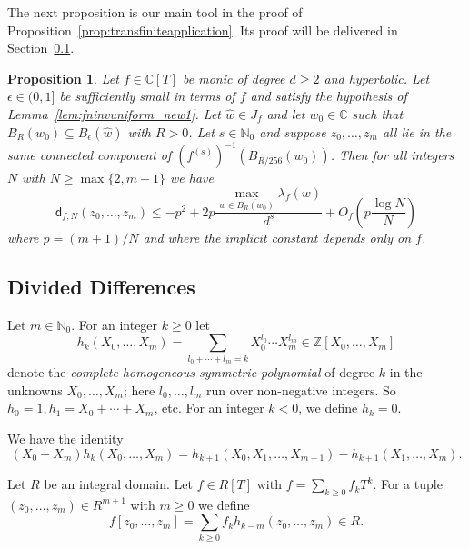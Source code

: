 \documentclass[12pt,oneside,a4]{amsart}
\newcommand{\IC}{\mathbb{C}}
\newcommand{\IN}{\mathbb{N}}
\newcommand{\IZ}{\mathbb{Z}}
\newcounter{maincounter}
\numberwithin{maincounter}{section}
\numberwithin{equation}{section}
\newtheorem{proposition}[maincounter]{Proposition}
\renewcommand{\subset}{\subseteq}
\begin{document}
The next proposition is our main tool in the proof of
Proposition~\ref{prop:transfiniteapplication}. Its proof will be
delivered in Section~\ref{subsec:genvander}.

\begin{proposition}
  \label{prop:vandermondepreboundhyperbolic}
  Let $f\in\IC[T]$ be monic of degree $d\ge 2$ and hyperbolic.
  Let $\epsilon\in (0,1]$ be sufficiently small in terms of $f$ and
  satisfy the hypothesis of  Lemma~\ref{lem:fninvuniform_new1}. 
  Let $\widehat w\in J_{f}$ and let $w_0\in\IC$
  such that $\overline{B_{R}(w_0)}\subset B_\epsilon(\widehat w)$ with
  $R>0$.
  Let $s\in\IN_0$ and suppose $z_0,\ldots,z_m$ all lie in the same
  connected component of 
  $(f^{(s)})^{-1}(B_{R/256}(w_0))$.
  Then for all integers $N$ with $N\ge \max\{2,m+1\}$ we have
  \begin{equation}
    \label{eq:thmvandermondepreboundhyperbolicbd}
    \mathsf{d}_{f,N}(z_0,\ldots,z_m)\le
    -p^2+
    2p \frac{\max_{w\in \overline{B_R(w_0)}} \lambda_f(w)}{d^s}  + O_f\left(p\frac{\log N}{N}\right)   
  \end{equation}
  where $p=(m+1)/N$ and where the implicit constant depends only on $f$.
\end{proposition}

\subsection{Divided Differences}
\label{subsec:genvander}


Let $m\in\IN_0$. For an integer $k\ge 0$ let
\begin{equation*}
  h_k(X_0,\ldots,X_m) = \sum_{l_0 + \cdots + l_m = k} X_0^{l_0}\cdots X_m^{l_m}
  \in \IZ[X_0,\ldots,X_m]
\end{equation*}
denote the \textit{complete homogeneous symmetric polynomial} of
degree $k$ in the unknowns $X_0,\ldots,X_m$; here $l_0,\ldots,l_m$
run over non-negative integers. So $h_0=1, h_1 =X_0+\cdots + X_m$, etc.
For an integer $k<0$, we define $h_k = 0$.

We have the identity
\begin{equation}
  \label{eq:dd_fundamental}
  (X_0-X_m) h_k(X_0,\ldots,X_m) = h_{k+1}(X_0,X_1,\ldots,X_{m-1}) - h_{k+1}(X_1,\ldots,X_m).
\end{equation}

Let $R$ be an integral domain. Let $f\in R[T]$ with $f = \sum_{k\ge 0}
f_k T^k$. For a tuple $(z_0,\ldots,z_m)\in R^{m+1}$ with $m\ge 0$ we
define
\begin{equation}
  \label{def:fz_0zm}
  f[z_0,\ldots,z_m] = \sum_{k\ge 0} f_{k} h_{k-m}(z_0,\ldots,z_m) \in R.
\end{equation}
\end{document}

